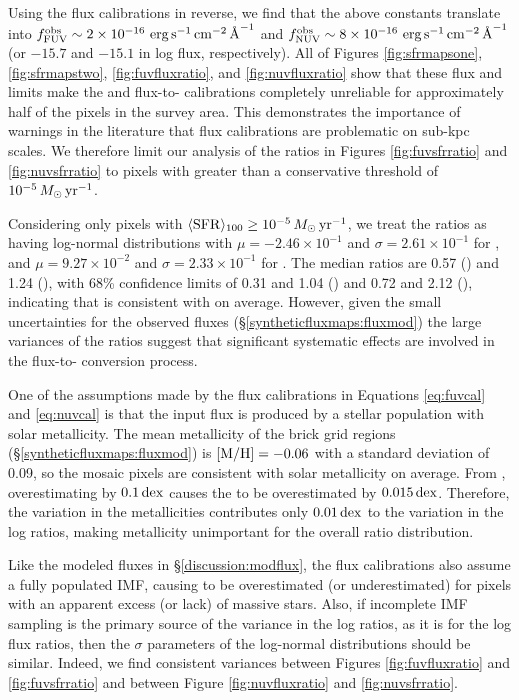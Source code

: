 \documentclass[iop, tighten]{emulateapj}
\begin{document}
Using the flux calibrations in reverse, we find that the above \sfr{} constants
translate into $f_{\mathrm{FUV}}^{\mathrm{obs}} \sim 2\times 10^{-16}\, \,\mathrm{erg}\,\mathrm{s}^{-1}\,\mathrm{cm}^{-2}\,\textrm{\AA}^{-1}$ and $f_{\mathrm{NUV}}^{\mathrm{obs}} \sim
8\times 10^{-16}\, \,\mathrm{erg}\,\mathrm{s}^{-1}\,\mathrm{cm}^{-2}\,\textrm{\AA}^{-1}$ (or $-15.7$ and $-15.1$ in log flux, respectively).
All of Figures  \ref{fig:sfrmapsone}, \ref{fig:sfrmapstwo},
\ref{fig:fuvfluxratio}, and \ref{fig:nuvfluxratio} show that these flux and
\sfr{} limits make the \fuv{} and \nuv{} flux-to-\sfr{} calibrations completely
unreliable for approximately half of the pixels in the survey area. This
demonstrates the importance of warnings in the literature
\citep[e.g.,][]{Murphy:2011,Kennicutt:2012,Leroy:2012} that flux calibrations
are problematic on sub-kpc scales. We therefore limit our analysis of the
\sfr{} ratios in Figures \ref{fig:fuvsfrratio} and \ref{fig:nuvsfrratio} to
pixels with \sfroneh{} greater than a conservative threshold of
$10^{-5}\,M_\odot\,\mathrm{yr}^{-1}$.

Considering only pixels with $\langle\mathrm{SFR}\rangle_{100} \ge 10^{-5}\,M_\odot\,\mathrm{yr}^{-1}$, we treat the
\sfr{} ratios as having log-normal distributions with $\mu = -2.46\times
10^{-1}$ and $\sigma = 2.61\times 10^{-1}$ for \fuv{}, and $\mu = 9.27\times
10^{-2}$ and $\sigma = 2.33\times 10^{-1}$ for \nuv{}. The median ratios are
0.57 (\fuv{}) and 1.24 (\nuv{}), with 68\% confidence limits of 0.31 and 1.04
(\fuv{}) and 0.72 and 2.12 (\nuv{}), indicating that \sfrx{} is consistent with
\sfroneh{} on average. However, given the small uncertainties for the observed
fluxes (\S \ref{syntheticfluxmaps:fluxmod}) the large variances of the \sfr{}
ratios suggest that significant systematic effects are involved in the
flux-to-\sfr{} conversion process.

One of the assumptions made by the flux calibrations in Equations
\ref{eq:fuvcal} and \ref{eq:nuvcal} is that the input flux is produced by a
stellar population with solar metallicity. The mean metallicity of the brick
grid regions (\S \ref{syntheticfluxmaps:fluxmod}) is $\mathrm{[M/H]} = -0.06$ with a
standard deviation of 0.09, so the mosaic pixels are consistent with solar
metallicity on average. From \citet{Simones:2014}, overestimating \met{} by
$0.1\,\mathrm{dex}$ causes the \sfr{} to be overestimated by $0.015\,\mathrm{dex}$. Therefore, the
variation in the metallicities contributes only $0.01\,\mathrm{dex}$ to the variation in
the log \sfr{} ratios, making metallicity unimportant for the overall \sfr{}
ratio distribution.

Like the modeled fluxes in \S \ref{discussion:modflux}, the flux calibrations
also assume a fully populated IMF, causing \sfrx{} to be overestimated (or
underestimated) for pixels with an apparent excess (or lack) of massive stars.
Also, if incomplete IMF sampling is the primary source of the variance in the
log \sfr{} ratios, as it is for the log flux ratios, then the $\sigma$
parameters of the log-normal distributions should be similar. Indeed, we find
consistent variances between Figures \ref{fig:fuvfluxratio} and
\ref{fig:fuvsfrratio} and between Figure \ref{fig:nuvfluxratio} and
\ref{fig:nuvsfrratio}.
\end{document}
